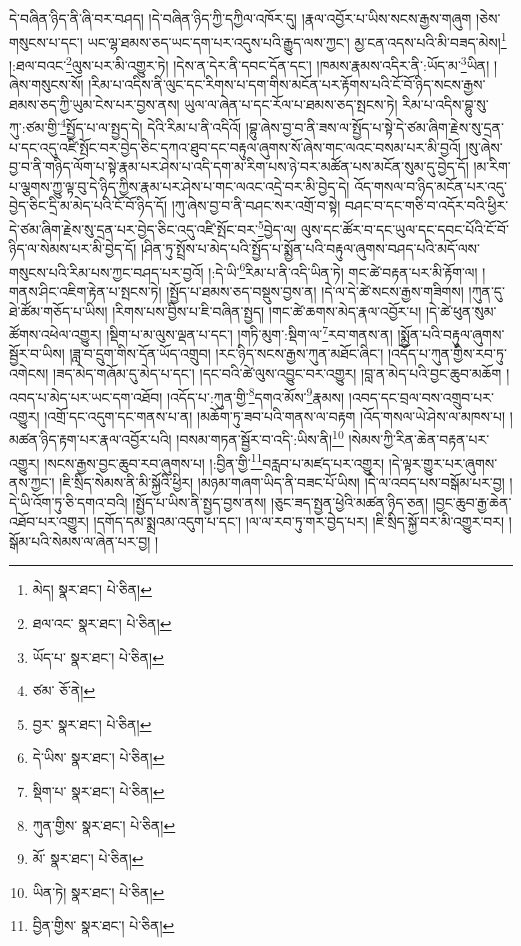 དེ་བཞིན་ཉིད་ནི་ཞི་བར་བཤད། །དེ་བཞིན་ཉིད་ཀྱི་དཀྱིལ་འཁོར་དུ། །རྣལ་འབྱོར་པ་ཡིས་སངས་རྒྱས་གཞུག །ཅེས་གསུངས་པ་དང་། ཡང་ལྷ་ཐམས་ཅད་ཡང་དག་པར་འདུས་པའི་རྒྱུད་ལས་ཀྱང་། མྱ་ངན་འདས་པའི་མི་བཟད་མེས།\footnote{མེད།  སྣར་ཐང་།  པེ་ཅིན། } །:ཐལ་བའང་\footnote{ཐལ་འང་  སྣར་ཐང་།  པེ་ཅིན། }ལུས་པར་མི་འགྱུར་ཏེ། །དེས་ན་དེར་ནི་དབང་དོན་དང་། །ཁམས་རྣམས་འདིར་ནི་:ཡོད་མ་\footnote{ཡོད་པ་  སྣར་ཐང་།  པེ་ཅིན། }ཡིན། །ཞེས་གསུངས་སོ། །རིམ་པ་འདིས་ནི་ལུང་དང་རིགས་པ་དག་གིས་མངོན་པར་རྟོགས་པའི་ངོ་བོ་ཉིད་སངས་རྒྱས་ཐམས་ཅད་ཀྱི་ཡུམ་ངེས་པར་བྱས་ནས། ཡུལ་ལ་ཞེན་པ་དང་རོལ་པ་ཐམས་ཅད་སྤངས་ཏེ། རིམ་པ་འདིས་བྷུ་སུ་ཀུ་:ཙམ་གྱི་\footnote{ཙམ་  ཅོ་ནེ། }སྤྱོད་པ་ལ་སྤྱད་དེ། དེའི་རིམ་པ་ནི་འདིའོ། །བྷུ་ཞེས་བྱ་བ་ནི་ཟས་ལ་སྤྱོད་པ་སྟེ་དེ་ཙམ་ཞིག་རྗེས་སུ་དྲན་པ་དང་འདུ་འཛི་སྤོང་བར་བྱེད་ཅིང་དཀའ་ཐུབ་དང་བརྟུལ་ཞུགས་སོ་ཞེས་གང་ལའང་བསམ་པར་མི་བྱའོ། །སུ་ཞེས་བྱ་བ་ནི་གཉིད་ལོག་པ་སྟེ་རྣམ་པར་ཤེས་པ་འདི་དག་མ་རིག་པས་ཉེ་བར་མཚོན་པས་མངོན་སུམ་དུ་བྱེད་དོ། །མ་རིག་པ་ལྕགས་ཀྱུ་ལྟ་བུ་དེ་ཉིད་ཀྱིས་རྣམ་པར་ཤེས་པ་གང་ལའང་འདྲེ་བར་མི་བྱེད་དེ། འོད་གསལ་བ་ཉིད་མངོན་པར་འདུ་བྱེད་ཅིང་དྲི་མ་མེད་པའི་ངོ་བོ་ཉིད་དོ། །ཀུ་ཞེས་བྱ་བ་ནི་བཤང་སར་འགྲོ་བ་སྟེ། བཤང་བ་དང་གཅི་བ་འདོར་བའི་ཕྱིར་དེ་ཙམ་ཞིག་རྗེས་སུ་དྲན་པར་བྱེད་ཅིང་འདུ་འཛི་སྤོང་བར་\footnote{བྱར་  སྣར་ཐང་།  པེ་ཅིན། }བྱེད་ལ། ལུས་དང་ཚོར་བ་དང་ཡུལ་དང་དབང་པོའི་ངོ་བོ་ཉིད་ལ་སེམས་པར་མི་བྱེད་དོ། །ཤིན་ཏུ་སྤྲོས་པ་མེད་པའི་སྤྱོད་པ་སྨྱོན་པའི་བརྟུལ་ཞུགས་བཤད་པའི་མདོ་ལས་གསུངས་པའི་རིམ་པས་ཀྱང་བཤད་པར་བྱའོ། །:དེ་ཡི་\footnote{དེ་ཡིས་  སྣར་ཐང་།  པེ་ཅིན། }རིམ་པ་ནི་འདི་ཡིན་ཏེ། གང་ཚེ་བརྟན་པར་མི་རྟོག་ལ། །གནས་ཤིང་འཇིག་རྟེན་པ་སྤངས་ཏེ། །སྤྱོད་པ་ཐམས་ཅད་བསྡུས་བྱས་ན། །དེ་ལ་དེ་ཚེ་སངས་རྒྱས་གཟིགས། །ཀུན་དུ་ཐེ་ཚོམ་གཅོད་པ་ཡིས། །རིགས་པས་བྱིས་པ་ཇི་བཞིན་སྤྱད། །གང་ཚེ་ཆགས་མེད་རྣལ་འབྱོར་པ། །དེ་ཚེ་ཕུན་སུམ་ཚོགས་འཕེལ་འགྱུར། །སྡིག་པ་མ་ལུས་ལྡན་པ་དང་། །གཏི་མུག་:སྡིག་ལ་\footnote{སྡིག་པ་  སྣར་ཐང་།  པེ་ཅིན། }རབ་གནས་ན། །སྨྱོན་པའི་བརྟུལ་ཞུགས་སྦྱོར་བ་ཡིས། །ཟླ་བ་དྲུག་གིས་དོན་ཡོད་འགྲུབ། །རང་ཉིད་སངས་རྒྱས་ཀུན་མཐོང་ཞིང་། །འདོད་པ་ཀུན་གྱིས་རབ་ཏུ་འགེངས། །ཟད་མེད་གཞོམ་དུ་མེད་པ་དང་། །དང་བའི་ཚེ་ལུས་འབྱུང་བར་འགྱུར། །བླ་ན་མེད་པའི་བྱང་ཆུབ་མཆོག །འབད་པ་མེད་པར་ཡང་དག་འཐོབ། །འདོད་པ་:ཀུན་གྱི་\footnote{ཀུན་གྱིས་  སྣར་ཐང་།  པེ་ཅིན། }དགའ་མོས་\footnote{མོ་  སྣར་ཐང་།  པེ་ཅིན། }རྣམས། །འབད་དང་བྲལ་བས་འགྲུབ་པར་འགྱུར། །འགྲོ་དང་འདུག་དང་གནས་པ་ན། །མཆོག་ཏུ་ཟབ་པའི་གནས་ལ་བརྟག །འོད་གསལ་ཡེ་ཤེས་ལ་མཁས་པ། །མཚན་ཉིད་རྟག་པར་རྣལ་འབྱོར་པའི། །བསམ་གཏན་སྦྱོར་བ་འདི་:ཡིས་ནི།\footnote{ཡིན་ཏེ།  སྣར་ཐང་།  པེ་ཅིན། } །སེམས་ཀྱི་རིན་ཆེན་བརྟན་པར་འགྱུར། །སངས་རྒྱས་བྱང་ཆུབ་རབ་ཞུགས་པ། །:བྱིན་གྱི་\footnote{བྱིན་གྱིས་  སྣར་ཐང་།  པེ་ཅིན། }བརླབ་པ་མཛད་པར་འགྱུར། །དེ་ལྟར་གྱུར་པར་ཞུགས་ནས་ཀྱང་། །ཇི་སྲིད་སེམས་ནི་མི་སྐྱོའི་ཕྱིར། །མཉམ་གཞག་ཡིད་ནི་བཟང་པོ་ཡིས། །དེ་ལ་འབད་པས་བསྒོམ་པར་བྱ། །དེ་ཡི་འོག་ཏུ་ཅི་དགའ་བའི། །སྤྱོད་པ་ཡིས་ནི་སྤྱད་བྱས་ནས། །ཅུང་ཟད་སྤྱན་ཕྱེའི་མཚན་ཉིད་ཅན། །བྱང་ཆུབ་རྒྱ་ཆེན་འཐོབ་པར་འགྱུར། །དགོད་དམ་སྨྲའམ་འདུག་པ་དང་། །ལ་ལ་རབ་ཏུ་གར་བྱེད་པར། །ཇི་སྲིད་སྐྱོ་བར་མི་འགྱུར་བར། །སྒོམ་པའི་སེམས་ལ་ཞེན་པར་བྱ། །
